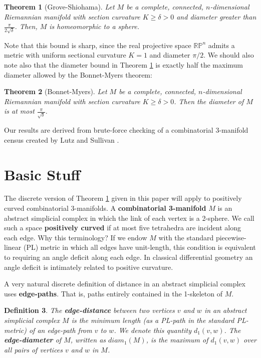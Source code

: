 \documentclass[12pt]{article}
\newtheorem{thm}{Theorem}[section]
\newtheorem{dfn}[thm]{Definition}
\begin{document}
\begin{thm}[Grove-Shiohama] Let $M$ be a complete, connected, $n$-dimensional Riemannian manifold with section curvature $K \geq \delta > 0$ and diameter greater than $\frac{\pi}{2\sqrt{\delta}}$. Then, $M$ is homeomorphic to a sphere.
\label{thm:grove_shiohama}
\end{thm}

\noindent Note that this bound is sharp, since the real projective space $\mathbb{RP}^n$ admits a metric with uniform sectional curvature $K=1$ and diameter $\pi/2$. We should also note also that the diameter bound in Theorem \ref{thm:grove_shiohama} is exactly half the maximum diameter allowed by the Bonnet-Myers theorem:

\begin{thm}[Bonnet-Myers] Let $M$ be a complete, connected, $n$-dimensional Riemannian manifold with section curvature $K \geq \delta > 0$. Then the diameter of $M$ is at most $\frac{\pi}{\sqrt{\delta}}$.
\label{thm:bonnet_myers}
\end{thm}

\noindent Our results are derived from brute-force checking of a combinatorial 3-manifold census created by Lutz and Sullivan \cite{LS}.

\section{Basic Stuff}
\label{sect:basics}

The discrete version of Theorem \ref{thm:grove_shiohama} given in this paper will apply to positively curved combinatorial 3-manifolds. A \textbf{combinatorial 3-manifold} $M$ is an abstract simplicial complex in which the link of each vertex is a 2-sphere. We call such a space \textbf{positively curved} if at most five tetrahedra are incident along each edge. Why this terminology? If we endow $M$ with the standard piecewise-linear (PL) metric in which all edges have unit-length, this condition is equivalent to requiring an angle deficit along each edge. In classical differential geometry an angle deficit is intimately related to positive curvature.

A very natural discrete definition of distance in an abstract simplicial complex uses \textbf{edge-paths}. That is, paths entirely contained in the 1-skeleton of $M$.

\begin{dfn}The \textbf{edge-distance} between two vertices $v$ and $w$ in an abstract simplicial complex $M$ is the minimum length (as a PL-path in the standard PL-metric) of an edge-path from $v$ to $w$. We denote this quantity $d_1(v,w)$. The \textbf{edge-diameter} of $M$, written as $diam_1(M)$, is the maximum of $d_1(v,w)$ over all pairs of vertices $v$ and $w$ in $M$. 
\end{dfn}
\end{document}
